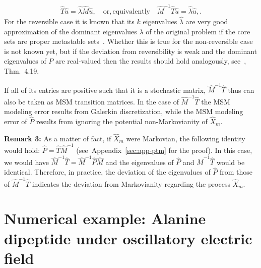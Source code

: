 \documentclass[aps, pre, preprint,unsortedaddress,a4paper,onecolumn,showkeys]{revtex4}
\begin{document}
\begin{align}
  \label{eq:msm-gen-ev}
\hat{T}\hat{u}=\hat{\lambda}\hat{M}\hat{u},\quad\mathrm{or, equivalently}\quad \hat{M}^{-1}\hat{T}\hat{u}=\hat{\lambda}\hat{u},.  
\end{align}
For the reversible case it is known that its $k$ eigenvalues $\hat{\lambda}$ are very good approximation of the dominant eigenvalues $\lambda$ of the original problem if the core sets are proper metastable sets~\cite{Eigenvalues}. Whether this is true for the non-reversible case is not known yet, but if the deviation from reversibility is weak and the dominant eigenvalues of $P$ are real-valued then the results should hold analogously, see~\cite{A19-31}, Thm.~4.19. 

If all of its entries are positive such that it is a stochastic matrix, $\hat{M}^{-1}\hat{T}$ thus can also be taken as MSM transition matrices. In the case of $\hat{M}^{-1}\hat{T}$ the MSM modeling error results from Galerkin discretization, while the MSM modeling error of $\hat{P}$ results from ignoring the potential non-Markovianity of $\hat{X}_m$.

\textbf{Remark 3:} As a matter of fact, if $\hat X_m$ were Markovian, the following identity would hold: $\hat P = \hat T \hat M^{-1}$ (see~Appendix~\ref{sec:app-ptm} for the proof). In this case, we would have $\hat{M}^{-1}\hat{T}=\hat{M}^{-1}\hat{P}\hat{M}$ and the eigenvalues of $\hat{P}$ and $\hat{M}^{-1}\hat{T}$ would be identical.
Therefore, in practice, the deviation of the eigenvalues of $\hat P$ from those of $\hat{M}^{-1}\hat{T}$ indicates the deviation from Markovianity regarding the process $\hat{X}_m$.





\section{Numerical example:
  Alanine dipeptide under oscillatory electric field}
\label{sec:alanine}
\end{document}
